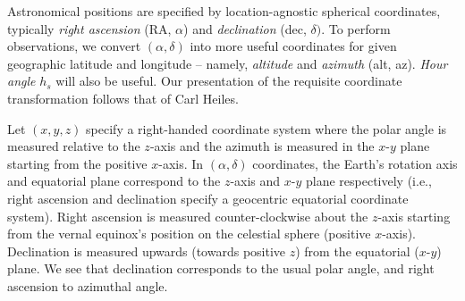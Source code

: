 \documentclass[10pt]{article}
\begin{document}
Astronomical positions are specified by location-agnostic spherical coordinates, typically \emph{right ascension} (RA, $\alpha$) and \emph{declination} (dec, $\delta)$.
To perform observations, we convert $(\alpha, \delta)$ into more useful coordinates for given geographic latitude and longitude -- namely, \emph{altitude} and \emph{azimuth} (alt, az).  \emph{Hour angle} $h_s$ will also be useful.
Our presentation of the requisite coordinate transformation follows that of Carl Heiles.

Let $(x,y,z)$ specify a right-handed coordinate system where the polar angle is measured relative to the $z$-axis and the azimuth is measured in the $x$-$y$ plane starting from the positive $x$-axis.
In $(\alpha, \delta)$ coordinates, the Earth's rotation axis and equatorial plane correspond to the $z$-axis and $x$-$y$ plane respectively (i.e., right ascension and declination specify a geocentric equatorial coordinate system).
Right ascension is measured counter-clockwise about the $z$-axis starting from the vernal equinox's position on the celestial sphere (positive $x$-axis).
Declination is measured upwards (towards positive $z$) from the equatorial ($x$-$y$) plane.
We see that declination corresponds to the usual polar angle, and right ascension to azimuthal angle.
\end{document}
